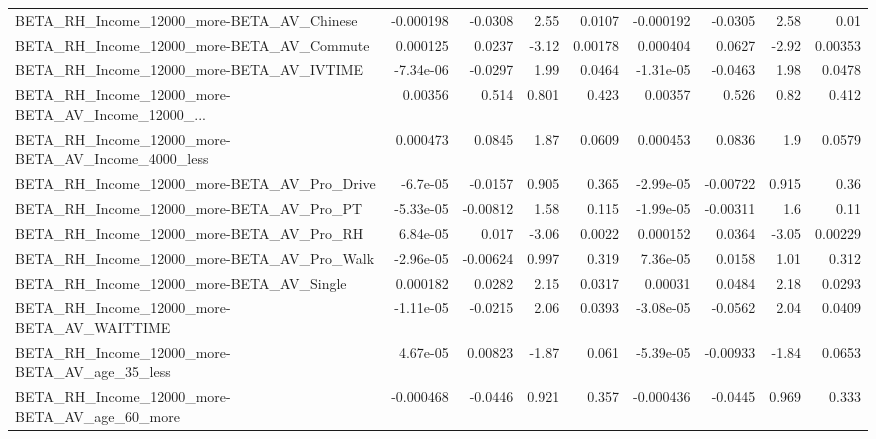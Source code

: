 \begin{tabular}{lrrrrrrrr}
BETA\_RH\_Income\_12000\_more-BETA\_AV\_Chinese          &   -0.000198 &      -0.0308 &      2.55 &   0.0107 &  -0.000192 &     -0.0305 &         2.58 &          0.01 \\
BETA\_RH\_Income\_12000\_more-BETA\_AV\_Commute          &    0.000125 &       0.0237 &     -3.12 &  0.00178 &   0.000404 &      0.0627 &        -2.92 &       0.00353 \\
BETA\_RH\_Income\_12000\_more-BETA\_AV\_IVTIME           &   -7.34e-06 &      -0.0297 &      1.99 &   0.0464 &  -1.31e-05 &     -0.0463 &         1.98 &        0.0478 \\
BETA\_RH\_Income\_12000\_more-BETA\_AV\_Income\_12000\_... &     0.00356 &        0.514 &     0.801 &    0.423 &    0.00357 &       0.526 &         0.82 &         0.412 \\
BETA\_RH\_Income\_12000\_more-BETA\_AV\_Income\_4000\_less &    0.000473 &       0.0845 &      1.87 &   0.0609 &   0.000453 &      0.0836 &          1.9 &        0.0579 \\
BETA\_RH\_Income\_12000\_more-BETA\_AV\_Pro\_Drive        &    -6.7e-05 &      -0.0157 &     0.905 &    0.365 &  -2.99e-05 &    -0.00722 &        0.915 &          0.36 \\
BETA\_RH\_Income\_12000\_more-BETA\_AV\_Pro\_PT           &   -5.33e-05 &     -0.00812 &      1.58 &    0.115 &  -1.99e-05 &    -0.00311 &          1.6 &          0.11 \\
BETA\_RH\_Income\_12000\_more-BETA\_AV\_Pro\_RH           &    6.84e-05 &        0.017 &     -3.06 &   0.0022 &   0.000152 &      0.0364 &        -3.05 &       0.00229 \\
BETA\_RH\_Income\_12000\_more-BETA\_AV\_Pro\_Walk         &   -2.96e-05 &     -0.00624 &     0.997 &    0.319 &   7.36e-05 &      0.0158 &         1.01 &         0.312 \\
BETA\_RH\_Income\_12000\_more-BETA\_AV\_Single           &    0.000182 &       0.0282 &      2.15 &   0.0317 &    0.00031 &      0.0484 &         2.18 &        0.0293 \\
BETA\_RH\_Income\_12000\_more-BETA\_AV\_WAITTIME         &   -1.11e-05 &      -0.0215 &      2.06 &   0.0393 &  -3.08e-05 &     -0.0562 &         2.04 &        0.0409 \\
BETA\_RH\_Income\_12000\_more-BETA\_AV\_age\_35\_less      &    4.67e-05 &      0.00823 &     -1.87 &    0.061 &  -5.39e-05 &    -0.00933 &        -1.84 &        0.0653 \\
BETA\_RH\_Income\_12000\_more-BETA\_AV\_age\_60\_more      &   -0.000468 &      -0.0446 &     0.921 &    0.357 &  -0.000436 &     -0.0445 &        0.969 &         0.333 \\

\end{tabular}
